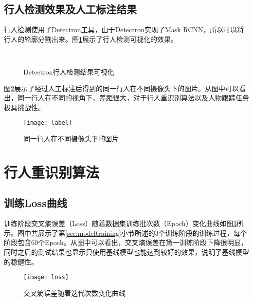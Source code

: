 \subsection{行人检测效果及人工标注结果}

行人检测使用了Detectron工具，由于Detectron实现了Mask RCNN，所以可以将行人的轮廓分割出来。图\ref{fig:detectron}展示了行人检测可视化的效果。

\begin{figure}[!ht]
\centering
\subfloat[场景1]{\centering\texttt{[image: 1-2\_5\_151]}}\quad
\subfloat[场景2]{\centering\texttt{[image: 3-7\_10\_394]}}\\
\quad
{}
\caption{Detectron行人检测结果可视化}
\label{fig:detectron}
\end{figure}

图\ref{fig:label}展示了经过人工标注后得到的同一行人在不同摄像头下的图片。从图中可以看出，同一行人在不同的视角下，差距很大，对于行人重识别算法以及人物跟踪任务极具挑战性。

\begin{figure}[!ht]
\centering
\texttt{[image: label]}
\caption{同一行人在不同摄像头下的图片}
\label{fig:label}
\end{figure}\vspace{-1em}

\section{行人重识别算法}

\subsection{训练Loss曲线}

训练阶段交叉熵误差（Loss）随着数据集训练批次数（Epoch）变化曲线如图\ref{fig:loss}所示。图中共展示了第\ref{sec:modeltraining}小节所述的3个训练阶段的训练过程，每个阶段包含60个Epoch。从图中可以看出，交叉熵误差在第一训练阶段下降很明显，同时之后的测试结果\cite{sun2017beyond}也显示只使用基线模型也能达到较好的效果，说明了基线模型的稳健性。

\begin{figure}[!ht]
\centering
\texttt{[image: loss]}
\caption{交叉熵误差随着迭代次数变化曲线}
\label{fig:loss}
\end{figure}

